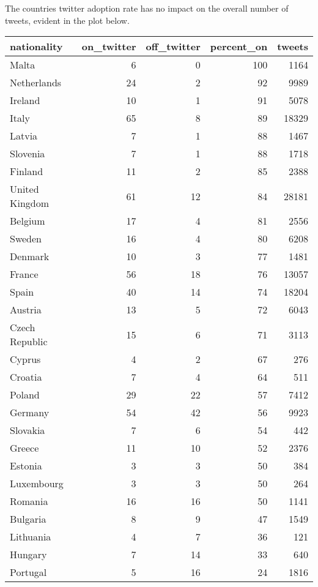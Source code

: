 \documentclass{article}\usepackage[]{graphicx}\usepackage[]{color}
\begin{document}
The countries twitter adoption rate has no impact on the overall number of tweets, evident in the plot below.

\begin{table}[ht]
\centering
\begin{tabular}{lrrrr}
  \hline
nationality & on\_twitter & off\_twitter & percent\_on & tweets \\ 
  \hline
Malta & 6 & 0 & 100 & 1164 \\ 
  Netherlands & 24 & 2 & 92 & 9989 \\ 
  Ireland & 10 & 1 & 91 & 5078 \\ 
  Italy & 65 & 8 & 89 & 18329 \\ 
  Latvia & 7 & 1 & 88 & 1467 \\ 
  Slovenia & 7 & 1 & 88 & 1718 \\ 
  Finland & 11 & 2 & 85 & 2388 \\ 
  United Kingdom & 61 & 12 & 84 & 28181 \\ 
  Belgium & 17 & 4 & 81 & 2556 \\ 
  Sweden & 16 & 4 & 80 & 6208 \\ 
  Denmark & 10 & 3 & 77 & 1481 \\ 
  France & 56 & 18 & 76 & 13057 \\ 
  Spain & 40 & 14 & 74 & 18204 \\ 
  Austria & 13 & 5 & 72 & 6043 \\ 
  Czech Republic & 15 & 6 & 71 & 3113 \\ 
  Cyprus & 4 & 2 & 67 & 276 \\ 
  Croatia & 7 & 4 & 64 & 511 \\ 
  Poland & 29 & 22 & 57 & 7412 \\ 
  Germany & 54 & 42 & 56 & 9923 \\ 
  Slovakia & 7 & 6 & 54 & 442 \\ 
  Greece & 11 & 10 & 52 & 2376 \\ 
  Estonia & 3 & 3 & 50 & 384 \\ 
  Luxembourg & 3 & 3 & 50 & 264 \\ 
  Romania & 16 & 16 & 50 & 1141 \\ 
  Bulgaria & 8 & 9 & 47 & 1549 \\ 
  Lithuania & 4 & 7 & 36 & 121 \\ 
  Hungary & 7 & 14 & 33 & 640 \\ 
  Portugal & 5 & 16 & 24 & 1816 \\ 
   \hline
\end{tabular}
\end{table}
\end{document}
